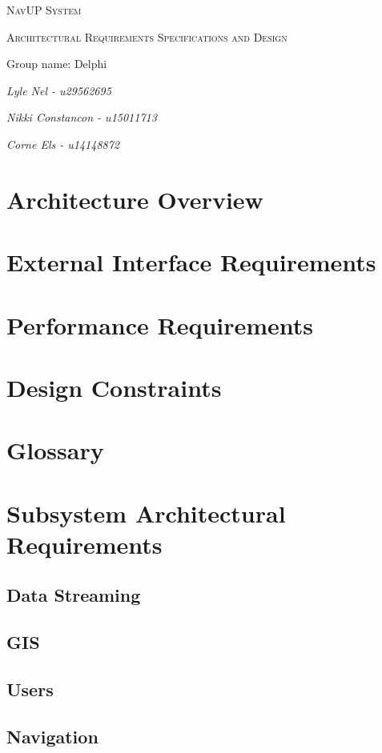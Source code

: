 \documentclass{article}
\begin{document}
\begin{titlepage}
	\centering
	\vfill
	{\scshape\LARGE NavUP System\par}
	\vfill
	{\scshape\Large Architectural Requirements Specifications and Design\par}
	\vfill
	{\Large Group name: Delphi\par}
	\bigskip 
	{\itshape\Large Lyle Nel - u29562695\par}
	{\itshape\Large Nikki Constancon - u15011713\par}
	{\itshape\Large Corne Els - u14148872\par}	
	\vfill
\end{titlepage}

\tableofcontents

\clearpage

\section{Architecture Overview}


\section{External Interface Requirements}


\section{Performance Requirements}


\section{Design Constraints}


\section{Glossary}


\section{Subsystem Architectural Requirements}
\clearpage
  \subsection{Data Streaming}
	
\clearpage
  \subsection{GIS}
	
\clearpage
  \subsection{Users}
	
\clearpage
  \subsection{Navigation}
	
\end{document}
